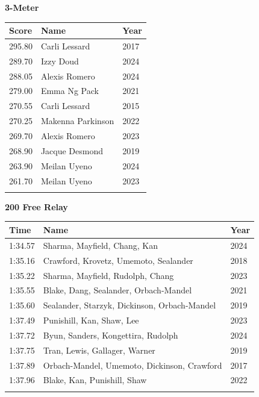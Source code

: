 \vspace{1.2em}
\noindent\begin{minipage}[t]{0.98\textwidth}
\centering
\textbf{\textcolor{teamprimary}{3-Meter}}\par
\vspace{0.5em}
\centering
\small
\renewcommand{\arraystretch}{1.0}
\setlength{\tabcolsep}{4pt}
\begin{tabular}{@{}p{1.8cm}p{3.0cm}p{1.0cm}@{}}
\toprule
\textbf{Score} & \textbf{Name} & \textbf{Year} \\
\midrule
295.80 & Carli Lessard & 2017 \\
289.70 & Izzy Doud & 2024 \\
288.05 & Alexis Romero & 2024 \\
279.00 & Emma Ng Pack & 2021 \\
270.55 & Carli Lessard & 2015 \\
270.25 & Makenna Parkinson & 2022 \\
269.70 & Alexis Romero & 2023 \\
268.90 & Jacque Desmond & 2019 \\
263.90 & Meilan Uyeno & 2024 \\
261.70 & Meilan Uyeno & 2023 \\
\bottomrule
\vspace{0.5em}
\end{tabular}
\end{minipage}
\vspace{1.2em}
\noindent\begin{minipage}[t]{0.98\textwidth}
\centering
\textbf{\textcolor{teamprimary}{200 Free Relay}}\par
\vspace{0.5em}
\centering
\small
\renewcommand{\arraystretch}{1.0}
\setlength{\tabcolsep}{4pt}
\begin{tabular}{@{}p{4.5cm}p{8.5cm}p{2.5cm}@{}}
\toprule
\textbf{Time} & \textbf{Name} & \textbf{Year} \\
\midrule
1:34.57 & Sharma, Mayfield, Chang, Kan & 2024 \\
1:35.16 & Crawford, Krovetz, Umemoto, Sealander & 2018 \\
1:35.22 & Sharma, Mayfield, Rudolph, Chang & 2023 \\
1:35.55 & Blake, Dang, Sealander, Orbach-Mandel & 2021 \\
1:35.60 & Sealander, Starzyk, Dickinson, Orbach-Mandel & 2019 \\
1:37.49 & Punishill, Kan, Shaw, Lee & 2023 \\
1:37.72 & Byun, Sanders, Kongettira, Rudolph & 2024 \\
1:37.75 & Tran, Lewis, Gallager, Warner & 2019 \\
1:37.89 & Orbach-Mandel, Umemoto, Dickinson, Crawford & 2017 \\
1:37.96 & Blake, Kan, Punishill, Shaw & 2022 \\
\bottomrule
\vspace{0.5em}
\end{tabular}
\end{minipage}
